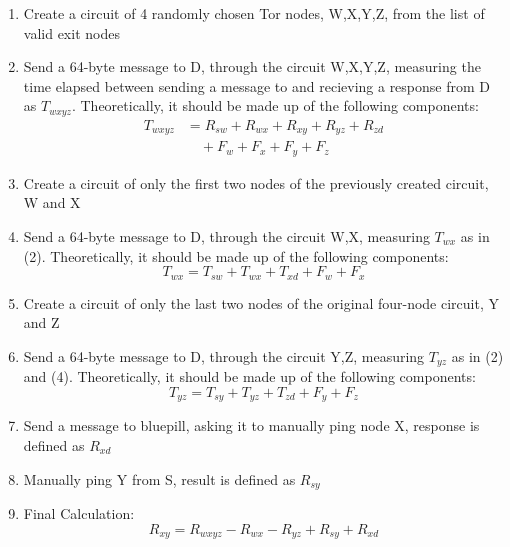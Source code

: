 \documentclass[twocolumn,11pt]{article}
\begin{document}
\begin{enumerate}
\item Create a circuit of 4 randomly chosen Tor nodes, W,X,Y,Z, from the list of valid exit nodes
\item Send a 64-byte message to D, through the circuit W,X,Y,Z, measuring the time elapsed between sending a message to and recieving a response from D as $T_{wxyz}$. Theoretically, it should be made up of the following components:
\begin{align*}
T_{wxyz} &= R_{sw} + R_{wx} + R_{xy} + R_{yz} + R_{zd} \\
  &\quad + F_w + F_x + F_y + F_z
\end{align*}
\item Create a circuit of only the first two nodes of the previously created circuit, W and X
\item Send a 64-byte message to D, through the circuit W,X, measuring $T_{wx}$ as in (2). Theoretically, it should be made up of the following components:
\[T_{wx} = T_{sw} + T_{wx} + T_{xd} + F_w + F_x\]
\item Create a circuit of only the last two nodes of the original four-node circuit, Y and Z
\item Send a 64-byte message to D, through the circuit Y,Z, measuring $T_{yz}$ as in (2) and (4). Theoretically, it should be made up of the following components:
\[
T_{yz} = T_{sy} + T_{yz} + T_{zd} + F_y + F_z
\]
\item Send a message to bluepill, asking it to manually ping node X, response is defined as $R_{xd}$
\item Manually ping Y from S, result is defined as $R_{sy}$
\item Final Calculation:
\[
R_{xy} = R_{wxyz} - R_{wx} - R_{yz} + R_{sy} + R_{xd}
\]
\end{enumerate}

\begin {center}
\end{center}
\end{document}
